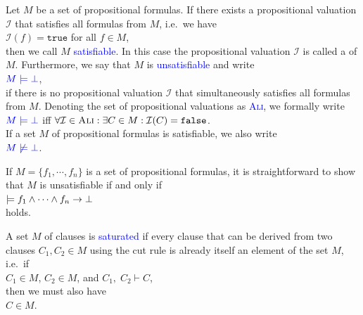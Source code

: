 \begin{Definition}[Satisfiability]  \hspace*{\fill} \linebreak
  Let $M$ be a set of propositional formulas.
  If there exists a propositional valuation $\mathcal{I}$ that satisfies all formulas from $M$, i.e.~we have
  \\[0.2cm]
  \hspace*{1.3cm}
  $\mathcal{I}(f) = \texttt{true}$ \quad for all $f \in M$,
  \\[0.2cm]
  then we call $M$ \textcolor{blue}{satisfiable}.  In this case the propositional
  valuation $\mathcal{I}$ is called a  of $M$.
  Furthermore, we say that $M$ is \textcolor{blue}{unsatisfiable}
  and write 
  \\[0.2cm]
  \hspace*{1.3cm}
  $\textcolor{blue}{M \models \bot}$, 
  \\[0.2cm]
  if there is no propositional valuation $\mathcal{I}$ that simultaneously satisfies all formulas from $M$.
  Denoting the set of propositional valuations as
  \textsc{\textcolor{blue}{Ali}}, we formally write
  \\[0.2cm]
  \hspace*{1.3cm}
  $\textcolor{blue}{M \models \bot}$ \quad iff \quad 
  $\forall \mathcal{I} \in \textsc{Ali}: \exists C \in M: \mathcal{I}(C) = \texttt{false}$.
  \\[0.2cm]
  If a set $M$ of propositional formulas is satisfiable, we also write
  \\[0.2cm]
  \hspace*{1.3cm}
  $\textcolor{blue}{M \not\models \bot}$.
  \eox
\end{Definition}

\remarkEng 
If $M = \{ f_1, \cdots, f_n \}$ is a set of propositional formulas, it is straightforward to show that
$M$ is unsatisfiable if and only if
\\[0.2cm]
\hspace*{1.3cm}
$\models f_1 \wedge \cdots \wedge f_n \rightarrow \bot$
\\[0.2cm]
holds. \eox

\begin{Definition} \hspace*{\fill} \linebreak
  A set $M$ of clauses is \textcolor{blue}{saturated}  if every clause that can be derived from two
  clauses $C_1, C_2 \in M$ using the cut rule is already itself an element of
  the set $M$, i.e.~if
  \\[0.2cm]
  \hspace*{1.3cm}
  $C_1 \in M$, \quad $C_2 \in M$, \quad and \quad $C_1,\; C_2 \vdash C$,
  \\[0.2cm]
  then we must also have 
  \\[0.2cm]
  \hspace*{1.3cm}
  $C \in M$.
\end{Definition}
 
